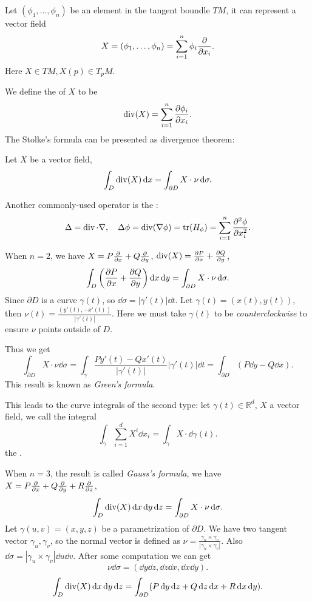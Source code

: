 Let $(\phi_1, \dots, \phi_n)$ be an element in the tangent boundle $TM$,
it can represent a vector field
\[
	X = (\phi_1,\dots, \phi_n) = \sum_{i=1}^{n} \phi_i\frac{\partial }{\partial x_i}.
\]
Here $X \in TM, X(p)\in T_pM$.

We define the  of $X$ to be
\[
\operatorname{div}(X) = \sum_{i=1}^{n} \frac{\partial \phi_i}{\partial x_i}.
\]
The Stolke's formula can be presented as divergence theorem:
\begin{theorem}
    Let $X$ be a vector field,
	\[
	\int_D \operatorname{div}(X) \mathop{}\!\mathrm{d} x = \int_{\partial D} X \cdot \nu \mathop{}\!\mathrm{d} \sigma.
	\]
\end{theorem}

Another commonly-used operator is the :
\[
\Delta = \operatorname{div} \cdot \nabla, \quad \Delta \phi = \operatorname{div}(\nabla \phi)
= \operatorname{tr}(H_\phi) = \sum_{i=1}^{n} \frac{\partial^2\phi}{\partial x_i^2}.
\]

When $n = 2$, we have $X = P\frac{\partial }{\partial x} + Q\frac{\partial }{\partial y}$,
$\operatorname{div}(X) = \frac{\partial P}{\partial x}+\frac{\partial Q}{\partial y}$,
\[
\int_D \left(\frac{\partial P}{\partial x} + \frac{\partial Q}{\partial y}\right)\mathop{}\!\mathrm{d} x\mathop{}\!\mathrm{d} y
= \int_{\partial D} X\cdot \nu \mathop{}\!\mathrm{d} \sigma.
\]
Since $\partial D$ is a curve $\gamma(t)$,
so $\dd \sigma = |\gamma'(t)| \dd t$.
Let $\gamma(t) = (x(t), y(t))$, then $\nu(t) = \frac{(y'(t), -x'(t))}{|\gamma'(t)|}$.
Here we must take $\gamma(t)$ to be \textit{counterclockwise} to ensure
$\nu$ points outside of $D$.

Thus we get
\[
\int_{\partial D} X\cdot \nu \dd \sigma
= \int_{\gamma} \frac{Py'(t) - Qx'(t)}{|\gamma'(t)|} |\gamma'(t)|\dd t
= \int_{\partial D} (P\dd y - Q\dd x).
\]
This result is known as \textit{Green's formula}.

This leads to the curve integrals of the second type:
let $\gamma(t)\in \mathbb{R}^d$, $X$ a vector field, we call the integral
\[
\int_{\gamma} \sum_{i=1}^{d} X^i\dd x_i = \int_{\gamma} X\cdot \dd \gamma(t).
\]
the .

When $n = 3$, the result is called \textit {Gauss's formula},
we have $X = P\frac{\partial }{\partial x}+Q\frac{\partial }{\partial y}+R\frac{\partial }{\partial z}$,
\[
\int_D \operatorname{div}(X) \mathop{}\!\mathrm{d} x\mathop{}\!\mathrm{d} y\mathop{}\!\mathrm{d} z = \int_{\partial D}X\cdot \nu\mathop{}\!\mathrm{d} \sigma.
\]
Let $\gamma(u, v) = (x, y, z)$ be a parametrization of $\partial D$.
We have two tangent vector $\gamma_u, \gamma_v$, so the normal vector
is defined as $\nu = \frac{\gamma_u \times \gamma_v}{|\gamma_u \times \gamma_v|}$.
Also $\dd \sigma = |\gamma_u \times \gamma_v|\dd u\dd v$.
After some computation we can get
\[
\nu \dd \sigma = (\dd y\dd z, \dd z\dd x, \dd x\dd y).
\]
\[
\int_D \Div(X)\dd x\dd y\dd z = \int_{\partial D}(P\dd y\dd z
+ Q\dd z\dd x + R\dd x\dd y).
\]

